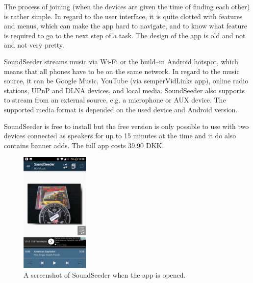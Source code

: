 The process of joining (when the devices are given the time of finding each other) is rather simple.
In regard to the user interface, it is quite clotted with features and menus, which can make the app hard to navigate,
and to know what feature is required to go to the next step of a task.
The design of the app is old and not and not very pretty.

SoundSeeder streams music via Wi-Fi or the build--in Android hotspot\cite{soundseether_faq}, 
which means that all phones have to be on the same network.
In regard to the music source, it can be Google Music, YouTube (via semperVidLinks app), online radio stations, UPnP and DLNA devices, and local media.
SoundSeeder also supports to stream from an external source, e.g. a microphone or AUX device. 
The supported media format is depended on the used device and Android version.\cite{soundseether_faq}

SoundSeeder is free to install but the free version is only possible to use with two devices connected as speakers for up to 15 minutes at the time and it do also contains banner adds.
The full app costs 39.90 DKK. 

\begin{figure}[h!]
    \centering
    \includegraphics[width=0.3\textwidth]{img/soundseeder.png}
    \caption{A screenshot of SoundSeeder when the app is opened.}
    \label{fig:soundseeder_screenshot}
\end{figure}

